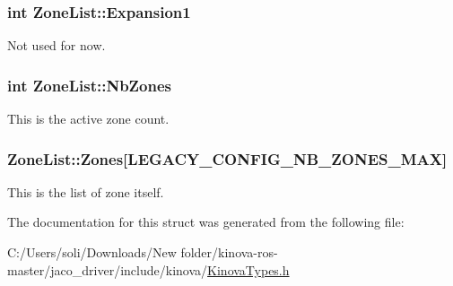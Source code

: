\subsubsection[{\texorpdfstring{Expansion1}{Expansion1}}]{\setlength{\rightskip}{0pt plus 5cm}int Zone\+List\+::\+Expansion1}\hypertarget{struct_zone_list_ab9e944f94ed520a133bbb7c3bf08f55d}{}\label{struct_zone_list_ab9e944f94ed520a133bbb7c3bf08f55d}


Not used for now. 

\subsubsection[{\texorpdfstring{Nb\+Zones}{NbZones}}]{\setlength{\rightskip}{0pt plus 5cm}int Zone\+List\+::\+Nb\+Zones}\hypertarget{struct_zone_list_a57c3da2ad7f954ad2c1171e435260716}{}\label{struct_zone_list_a57c3da2ad7f954ad2c1171e435260716}


This is the active zone count. 

\subsubsection[{\texorpdfstring{Zones}{Zones}}]{ Zone\+List\+::\+Zones\mbox{[}{\bf L\+E\+G\+A\+C\+Y\+\_\+\+C\+O\+N\+F\+I\+G\+\_\+\+N\+B\+\_\+\+Z\+O\+N\+E\+S\+\_\+\+M\+AX}\mbox{]}}\hypertarget{struct_zone_list_aeabee24f26e18a9091b22593597a6132}{}\label{struct_zone_list_aeabee24f26e18a9091b22593597a6132}


This is the list of zone itself. 



The documentation for this struct was generated from the following file\+:\begin{DoxyCompactItemize}
\item 
C\+:/\+Users/soli/\+Downloads/\+New folder/kinova-\/ros-\/master/jaco\+\_\+driver/include/kinova/\hyperlink{_kinova_types_8h}{Kinova\+Types.\+h}\end{DoxyCompactItemize}
